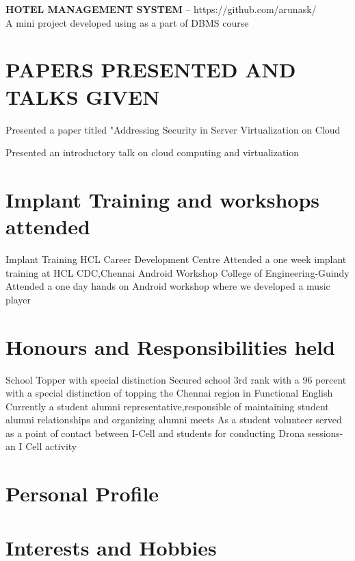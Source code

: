 \documentclass[11pt,a4paper]{moderncv}
\begin{document}
\cvlistitem
{\textbf{HOTEL MANAGEMENT SYSTEM} -- {\small https://github.com/arunask/}
  \\A mini project developed using as a part of DBMS course \\
}

\section{PAPERS PRESENTED AND TALKS GIVEN}

{Presented a paper titled "Addressing Security in Server Virtualization on Cloud}


{Presented an introductory talk on cloud computing and virtualization}


\section{Implant Training and workshops attended}
 {Implant Training} {HCL Career Development Centre}{}{}
{Attended a one week implant training at HCL CDC,Chennai }
 {Android Workshop} {College of Engineering-Guindy}{}{}
{Attended a one day hands on Android workshop where we developed a music player }

\section {Honours and Responsibilities held} 
 {School Topper with special distinction} {}{}{}
{Secured school 3rd rank with a 96 percent with a special distinction of topping the Chennai region in Functional English }
{Currently a student alumni representative,responsible of maintaining student alumni relationships and organizing alumni meets }
{As a student volunteer served as a point of contact between I-Cell and students for conducting Drona sessions-an I Cell activity }

\section {Personal Profile}


\section{Interests and Hobbies}







\end{document}
